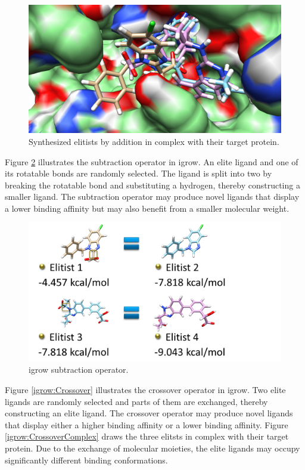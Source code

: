 \begin{figure}
\centering
\includegraphics[width=\textwidth]{igrow/AdditionComplex.png}
\caption{Synthesized elitists by addition in complex with their target protein.}
\label{igrow:AdditionComplex}
\end{figure}

Figure \ref{igrow:Subtraction} illustrates the subtraction operator in igrow. An elite ligand and one of its rotatable bonds are randomly selected. The ligand is split into two by breaking the rotatable bond and substituting a hydrogen, thereby constructing a smaller ligand. The subtraction operator may produce novel ligands that display a lower binding affinity but may also benefit from a smaller molecular weight.

\begin{figure}
\centering
\includegraphics[width=\textwidth]{igrow/Subtraction.png}
\caption{igrow subtraction operator.}
\label{igrow:Subtraction}
\end{figure}

Figure \ref{igrow:Crossover} illustrates the crossover operator in igrow. Two elite ligands are randomly selected and parts of them are exchanged, thereby constructing an elite ligand. The crossover operator may produce novel ligands that display either a higher binding affinity or a lower binding affinity. Figure \ref{igrow:CrossoverComplex} draws the three elitsts in complex with their target protein. Due to the exchange of molecular moieties, the elite ligands may occupy significantly different binding conformations.

